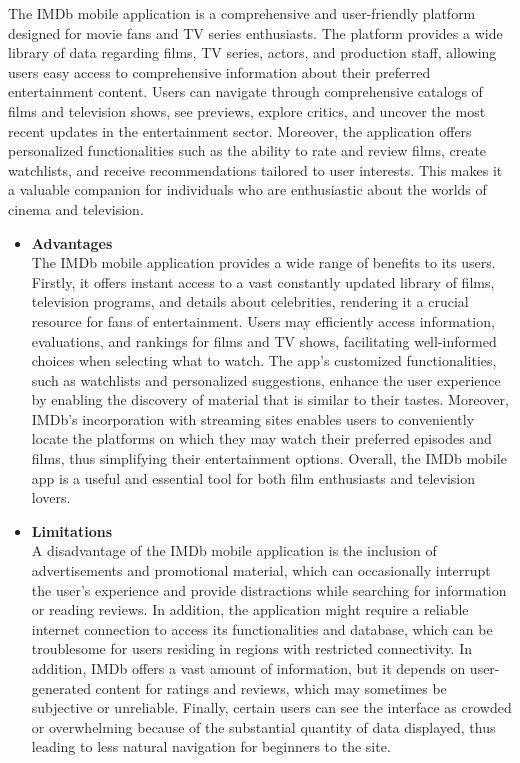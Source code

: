 The IMDb mobile application is a comprehensive and user-friendly platform designed for movie fans and TV series enthusiasts. The platform provides a wide library of data regarding films, TV series, actors, and production staff, allowing users easy access to comprehensive information about their preferred entertainment content. Users can navigate through comprehensive catalogs of films and television shows, see previews, explore critics, and uncover the most recent updates in the entertainment sector. Moreover, the application offers personalized functionalities such as the ability to rate and review films, create watchlists, and receive recommendations tailored to user interests. This makes it a valuable companion for individuals who are enthusiastic about the worlds of cinema and television. \pagebreak
\begin{itemize}[\label{}]
    \item \textbf{Advantages} \\
    The IMDb mobile application provides a wide range of benefits to its users. Firstly, it offers instant access to a vast constantly updated library of films, television programs, and details about celebrities, rendering it a crucial resource for fans of entertainment. Users may efficiently access information, evaluations, and rankings for films and TV shows, facilitating well-informed choices when selecting what to watch. The app's customized functionalities, such as watchlists and personalized suggestions, enhance the user experience by enabling the discovery of material that is similar to their tastes. Moreover, IMDb's incorporation with streaming sites enables users to conveniently locate the platforms on which they may watch their preferred episodes and films, thus simplifying their entertainment options. Overall, the IMDb mobile app is a useful and essential tool for both film enthusiasts and television lovers.
    \item \textbf{Limitations} \\
    A disadvantage of the IMDb mobile application is the inclusion of advertisements and promotional material, which can occasionally interrupt the user's experience and provide distractions while searching for information or reading reviews. In addition, the application might require a reliable internet connection to access its functionalities and database, which can be troublesome for users residing in regions with restricted connectivity. In addition, IMDb offers a vast amount of information, but it depends on user-generated content for ratings and reviews, which may sometimes be subjective or unreliable. Finally, certain users can see the interface as crowded or overwhelming because of the substantial quantity of data displayed, thus leading to less natural navigation for beginners to the site.
\end{itemize}
\pagebreak

